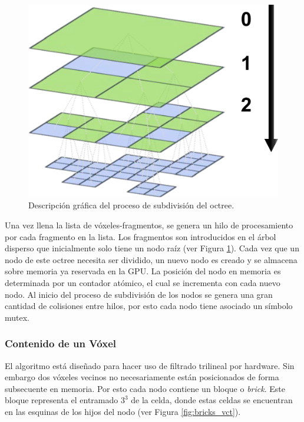 \begin{figure}
	\includegraphics[width=0.95\linewidth]{media/miplevels.png}
	\caption{Descripción gráfica del proceso de subdivisión del octree.}
	\label{fig:miplevels}
\end{figure}
\noindent Una vez llena la lista de vóxeles-fragmentos, se genera un hilo de procesamiento por cada fragmento en la lista. Los fragmentos son introducidos en el árbol disperso que inicialmente solo tiene un nodo raíz (ver Figura \ref{fig:miplevels}). Cada vez que un nodo de este octree necesita ser dividido, un nuevo nodo es creado y se almacena sobre memoria ya reservada en la \ac{GPU}. La posición del nodo en memoria es determinada por un contador atómico, el cual se incrementa con cada nuevo nodo. Al inicio del proceso de subdivisión de los nodos se genera una gran cantidad de colisiones entre hilos, por esto cada nodo tiene asociado un símbolo mutex.

\subsubsection{Contenido de un Vóxel}
\label{subsub:voxelcontent_orig}

El algoritmo está diseñado para hacer uso de filtrado trilineal por hardware. Sin embargo dos vóxeles vecinos no necesariamente están posicionados de forma subsecuente en memoria. Por esto cada nodo contiene un bloque o \emph{brick}. Este bloque representa el entramado $3^3$ de la celda, donde estas celdas se encuentran en las esquinas de los hijos del nodo (ver Figura \ref{fig:bricks_vct}).

